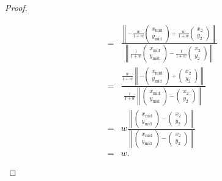 \begin{proof}
\begin{enumerate}
\begin{eqnarray*}
        & = & \frac{\left\|-\frac{w}{1+w}\left(\begin{array}{c} x_{\text{mid}}\\ y_{\text{mid}}\end{array}\right) + \frac{w}{1+w}\left(\begin{array}{c} x_2\\ y_2\end{array}\right)\right\|}{\left\|\frac{1}{1+w}\left(\begin{array}{c} x_{\text{mid}}\\ y_{\text{mid}}\end{array}\right) - \frac{1}{1+w}\left(\begin{array}{c} x_2\\ y_2\end{array}\right)\right\|}\\        
        & = & \frac{\frac{w}{1+w}\left\|-\left(\begin{array}{c} x_{\text{mid}}\\ y_{\text{mid}}\end{array}\right) + \left(\begin{array}{c} x_2\\ y_2\end{array}\right)\right\|}{\frac{1}{1+w}\left\|\left(\begin{array}{c} x_{\text{mid}}\\ y_{\text{mid}}\end{array}\right) - \left(\begin{array}{c} x_2\\ y_2\end{array}\right)\right\|}\\        
        & = & w\frac{\left\|\left(\begin{array}{c} x_{\text{mid}}\\ y_{\text{mid}}\end{array}\right) - \left(\begin{array}{c} x_2\\ y_2\end{array}\right)\right\|}{\left\|\left(\begin{array}{c} x_{\text{mid}}\\ y_{\text{mid}}\end{array}\right) - \left(\begin{array}{c} x_2\\ y_2\end{array}\right)\right\|}\\        
        & = & w.
    \end{eqnarray*}
    \end{enumerate}
\end{proof}

